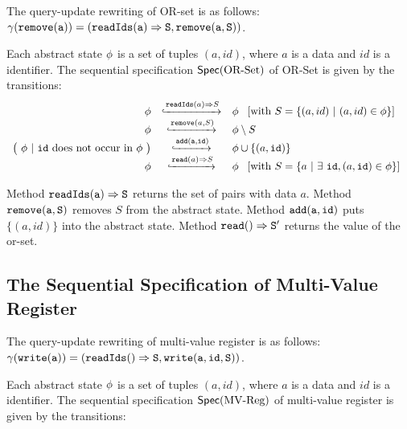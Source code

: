 The query-update rewriting of OR-set is as follows: $\gamma( \alabelshort[{\tt remove}]{a} ) = ( \alabellong[{\tt readIds}]{a}{S}{}, \alabelshort[{\tt remove}]{a,S})$.

Each abstract state $\phi$ is a set of tuples $(a,id)$, where $a$ is a data and $id$ is a identifier. The sequential specification $\mathsf{Spec}(\text{OR\text{-}Set})$ of OR-Set is given by the transitions:
\[
  \begin{array}{rcl}
    \abstate
    & \specarrow{\alabellong[\mathtt{readIds}]{a}{S}{}}
    & \abstate\
      \begin{array}{c}
        [\text{with}\ S = \{ (a,id)\ \vert\ (a,id) \in \abstate\}]
      \end{array}\\
    \abstate &
               \specarrow{\alabelshort[\mathtt{remove}]{a,S}}
    & \abstate \setminus S \\
    \big(\ \abstate\ |\ \mathtt{id}\ \text{does not occur in } \abstate\ \big)
             & \specarrow{ \alabelshort[{\tt add}]{a,id} }
    & \abstate \cup \{ (a,\mathtt{id}) \}\\
    \abstate
    & \specarrow{\alabellong[\mathtt{read}]{a}{ S }{}}
    & \abstate\
      \begin{array}{c}
        [\text{with}\ S = \{ a\ \vert\ \exists\ \mathtt{id}, (a,\mathtt{id}) \in \abstate \}]
      \end{array}
  \end{array}
\]

Method $\alabellong[{\tt readIds}]{a}{S}{}$ returns the set of pairs with data $a$. Method $\alabelshort[{\tt remove}]{a,S}$ removes $S$ from the abstract state. Method $\alabelshort[{\tt add}]{a,id}$ puts $\{ (a,id) \}$ into the abstract state. Method $\alabellong[{\tt read}]{}{S'}{}$ returns the value of the or-set.




\subsection{The Sequential Specification of Multi-Value Register}
\label{subsec:the sequential specification of multi-value register}

The query-update rewriting of multi-value register is as follows: $\gamma( \alabelshort[{\tt write}]{a}) = ( \alabellong[{\tt readIds}]{}{S}{}, \alabelshort[{\tt write}]{a,id,S})$.

Each abstract state $\phi$ is a set of tuples $(a,id)$, where $a$ is a data and $id$ is a identifier. The sequential specification $\mathsf{Spec}(\text{MV\text{-}Reg})$ of multi-value register is given by the transitions:

